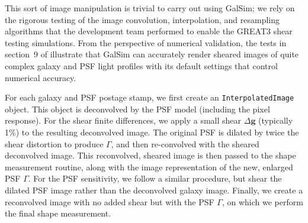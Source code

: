 \documentclass[iop]{emulateapj}
\newcommand\rmcomment[1]{\textcolor{red}{(RM: #1)}}
\begin{document}
This sort of image manipulation is trivial to carry out using GalSim;
we rely on the rigorous testing of the image convolution,
interpolation, and resampling algorithms that the development team
performed to enable the GREAT3 shear testing simulations.  From the
perspective of numerical validation, the tests in section~9 of
\cite{2015A&C....10..121R} illustrate that GalSim can accurately
render sheared images of quite complex galaxy and PSF light profiles
with its default settings that control numerical accuracy.

For each galaxy and PSF postage stamp, we first create an
\texttt{InterpolatedImage} object. This object is deconvolved by the
PSF model (including the pixel response). For the shear finite
differences, we apply a small shear $\Delta\mathbf{g}$ (typically 1\%)
to the resulting deconvolved image. The original PSF is dilated by
twice the shear distortion to produce $\Gamma$, and then re-convolved
with the sheared deconvolved image. This reconvolved, sheared image is
then passed to the shape measurement routine, along with the image
representation of the new, enlarged PSF $\Gamma$. For the PSF
sensitivity, we follow a similar procedure, but shear the dilated PSF
image rather than the deconvolved galaxy image. Finally, we create a
reconvolved image with no added shear but with the PSF $\Gamma$, on
which we perform the final shape measurement.

\end{document}
